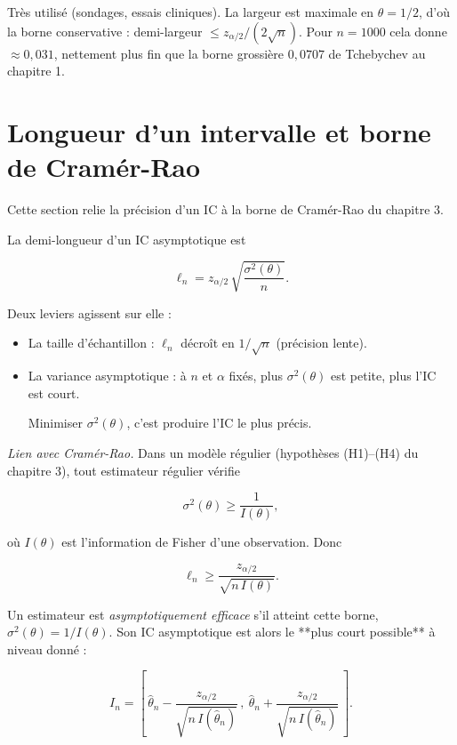 \begin{remarque}
Très utilisé (sondages, essais cliniques). La largeur est maximale en $\theta = 1/2$, d'où la borne conservative : demi-largeur $\le z_{\alpha/2}/(2\sqrt n)$. Pour $n = 1000$ cela donne $\approx 0{,}031$, nettement plus fin que la borne grossière $0{,}0707$ de Tchebychev au chapitre 1.
\end{remarque}

\section{Longueur d'un intervalle et borne de Cramér-Rao}

Cette section relie la précision d'un IC à la borne de Cramér-Rao du chapitre 3.

La demi-longueur d'un IC asymptotique est

$$
\ell_n = z_{\alpha/2}\,\sqrt{\frac{\sigma^2(\theta)}{n}}.
$$

Deux leviers agissent sur elle :

\begin{itemize}
\item La taille d'échantillon : $\ell_n$ décroît en $1/\sqrt n$ (précision lente).
\item La variance asymptotique : à $n$ et $\alpha$ fixés, plus $\sigma^2(\theta)$ est petite, plus l'IC est court. 

Minimiser $\sigma^2(\theta)$, c'est produire l'IC le plus précis.
\end{itemize}

\textit{Lien avec Cramér-Rao.} Dans un modèle régulier (hypothèses (H1)–(H4) du chapitre 3), tout estimateur régulier vérifie

$$
\sigma^2(\theta) \ge \frac{1}{I(\theta)},
$$

où $I(\theta)$ est l'information de Fisher d'une observation. Donc

$$
\ell_n \ge \frac{z_{\alpha/2}}{\sqrt{n\,I(\theta)}}.
$$

\medskip

\begin{mdframed}
\begin{definition} 
Un estimateur est \textit{asymptotiquement efficace} s'il atteint cette borne, $\sigma^2(\theta) = 1/I(\theta)$. Son IC asymptotique est alors le **plus court possible** à niveau donné :

$$
I_n = \left[\,\hat\theta_n - \frac{z_{\alpha/2}}{\sqrt{n\,I(\hat\theta_n)}}\,,\ \hat\theta_n + \frac{z_{\alpha/2}}{\sqrt{n\,I(\hat\theta_n)}}\,\right].
$$
\end{definition}
\end{mdframed}

